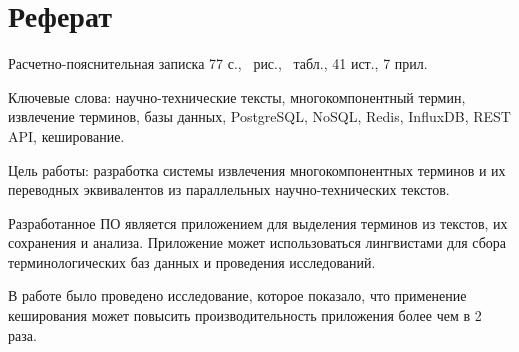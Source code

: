 \section*{Реферат}

Расчетно-пояснительная записка 77 с., \totalfigures\ рис., \totaltables\ табл., 41 ист., 7 прил.

Ключевые слова: научно-технические тексты, многокомпонентный термин, извлечение терминов, базы данных, PostgreSQL, NoSQL, Redis, InfluxDB, REST API, кеширование.


Цель работы: разработка системы извлечения многокомпонентных терминов и их переводных эквивалентов из параллельных научно-технических текстов.

Разработанное ПО является приложением для выделения терминов из текстов, их сохранения и анализа. Приложение может использоваться лингвистами для сбора терминологических баз данных и проведения исследований.

В работе было проведено исследование, которое показало, что применение кеширования может повысить производительность приложения более чем в 2 раза.



\pagebreak